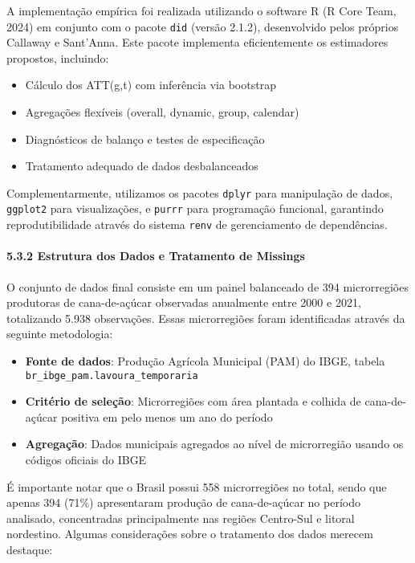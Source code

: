 \documentclass[
  brazilian,
  12pt,
  a4paper,
]{article}
\providecommand{\tightlist}{%
  \setlength{\itemsep}{0pt}\setlength{\parskip}{0pt}}
\begin{document}
A implementação empírica foi realizada utilizando o software R (R Core
Team, 2024) em conjunto com o pacote \texttt{did} (versão 2.1.2),
desenvolvido pelos próprios Callaway e Sant'Anna. Este pacote implementa
eficientemente os estimadores propostos, incluindo:

\begin{itemize}
\tightlist
\item
  Cálculo dos ATT(g,t) com inferência via bootstrap
\item
  Agregações flexíveis (overall, dynamic, group, calendar)
\item
  Diagnósticos de balanço e testes de especificação
\item
  Tratamento adequado de dados desbalanceados
\end{itemize}

Complementarmente, utilizamos os pacotes \texttt{dplyr} para manipulação
de dados, \texttt{ggplot2} para visualizações, e \texttt{purrr} para
programação funcional, garantindo reprodutibilidade através do sistema
\texttt{renv} de gerenciamento de dependências.

\paragraph{\texorpdfstring{\textbf{5.3.2 Estrutura dos Dados e
Tratamento de
Missings}}{5.3.2 Estrutura dos Dados e Tratamento de Missings}}\label{estrutura-dos-dados-e-tratamento-de-missings}

O conjunto de dados final consiste em um painel balanceado de 394
microrregiões produtoras de cana-de-açúcar observadas anualmente entre
2000 e 2021, totalizando 5.938 observações. Essas microrregiões foram
identificadas através da seguinte metodologia:

\begin{itemize}
\tightlist
\item
  \textbf{Fonte de dados}: Produção Agrícola Municipal (PAM) do IBGE,
  tabela \texttt{br\_ibge\_pam.lavoura\_temporaria}
\item
  \textbf{Critério de seleção}: Microrregiões com área plantada e
  colhida de cana-de-açúcar positiva em pelo menos um ano do período
\item
  \textbf{Agregação}: Dados municipais agregados ao nível de
  microrregião usando os códigos oficiais do IBGE
\end{itemize}

É importante notar que o Brasil possui 558 microrregiões no total, sendo
que apenas 394 (71\%) apresentaram produção de cana-de-açúcar no período
analisado, concentradas principalmente nas regiões Centro-Sul e litoral
nordestino. Algumas considerações sobre o tratamento dos dados merecem
destaque:
\end{document}
